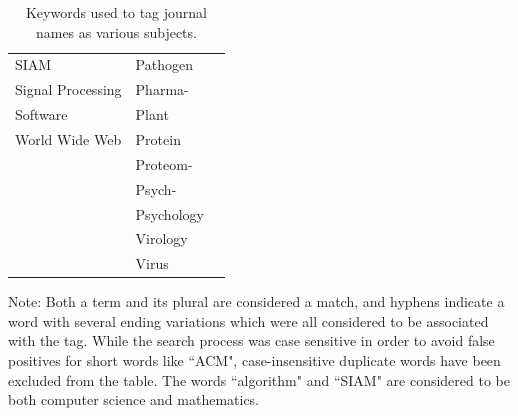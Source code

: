 \documentclass[12pt]{thesis}
\theoremstyle{plain}
\theoremstyle{definition}
\theoremstyle{remark}
\begin{document}
\begin{table}[p]
\begin{tabular}{| l | l | l |}
SIAM & Pathogen & \\
Signal Processing & Pharma- & \\
Software & Plant & \\
World Wide Web & Protein & \\
 & Proteom- & \\
 & Psych- & \\
 & Psychology & \\
 & Virology & \\
 & Virus & \\
\hline
\end{tabular}
\caption{Keywords used to tag journal names as various subjects.}
\vspace{-6pt}\flushleft\footnotesize *Note: Both a term and its plural are considered a match, and hyphens indicate a word with several ending variations which were all considered to be associated with the tag. While the search process was case sensitive in order to avoid false positives for short words like ``ACM", case-insensitive duplicate words have been excluded from the table. The words ``algorithm" and ``SIAM" are considered to be both computer science and mathematics.
\label{tab:tagging_keywords}
\end{table}





\printindex
\end{document}
